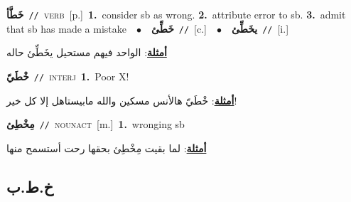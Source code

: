 \documentclass[10pt,a4paper,twoside]{article} %
\begin{document}
\begin{multicols}{2}
{\setlength\topsep{0pt}\textbf{\foreignlanguage{arabic}{خَطَّأ}}\ {\color{gray}\texttt{//}\color{black}}\ \textsc{verb}\ [p.]\ \textbf{1.}~consider sb as wrong.  \textbf{2.}~attribute error to sb.  \textbf{3.}~admit that sb has made a mistake\ \ $\bullet$\ \ \setlength\topsep{0pt}\textbf{\foreignlanguage{arabic}{خَطِّئ}}\ {\color{gray}\texttt{//}\color{black}}\ [c.]\ \ $\bullet$\ \ \setlength\topsep{0pt}\textbf{\foreignlanguage{arabic}{يخَطِّئ}}\ {\color{gray}\texttt{//}\color{black}}\ [i.]\  \begin{flushright}\color{gray}\foreignlanguage{arabic}{\textbf{\underline{\foreignlanguage{arabic}{أمثلة}}}: الواحد فيهم مستحيل يخَطِّئ حاله}\end{flushright}\color{black}} \vspace{2mm}

{\setlength\topsep{0pt}\textbf{\foreignlanguage{arabic}{خْطَيّ}}\ {\color{gray}\texttt{//}\color{black}}\ \textsc{interj}\ \textbf{1.}~Poor X!\  \begin{flushright}\color{gray}\foreignlanguage{arabic}{\textbf{\underline{\foreignlanguage{arabic}{أمثلة}}}: خْطَيّ هالأنس مسكين والله مابيستاهل إلا كل خير!}\end{flushright}\color{black}} \vspace{2mm}

{\setlength\topsep{0pt}\textbf{\foreignlanguage{arabic}{مِخْطِئ}}\ {\color{gray}\texttt{//}\color{black}}\ \textsc{noun\textunderscore act}\ [m.]\ \textbf{1.}~wronging sb\  \begin{flushright}\color{gray}\foreignlanguage{arabic}{\textbf{\underline{\foreignlanguage{arabic}{أمثلة}}}: لما بقيت مِخْطِئ بحقها رحت أستسمح منها}\end{flushright}\color{black}} \vspace{2mm}

\vspace{-3mm}
\subsection*{\color{blue}\foreignlanguage{arabic}{خ.ط.ب}\color{blue}{}} 


\end{multicols}
\end{document}
